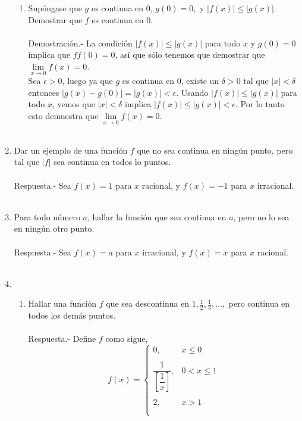 \begin{enumerate}[\bfseries 1.]
\begin{enumerate}[\bfseries (a)]
	\item Supóngase que $g$ es continua en $0$, $g(0)=0,$ y $|f(x)|\leq |g(x)|.$ Demostrar que $f$ es continua en $0$.\\\\
	    Demostración.-\; La condición $|f(x)|\leq |g(x)|$ para todo $x$ y $g(0)=0$ implica que $ff(0)=0$, así que sólo tenemos que demostrar que $\lim\limits_{x\to 0} f(x) = 0$.\\
	    Sea $\epsilon>0$, luego ya que $g$ es continua en $0$, existe un $\delta >0$ tal que $|x|<\delta$ entonces $|g(x)-g(0)|=|g(x)|<\epsilon$. Usando $|f(x)|\leq |g(x)|$ para todo $x$, vemos que $|x|<\delta$ implica $|f(x)|\leq |g(x)|<\epsilon$. Por lo tanto esto demuestra que $\lim\limits_{x\to 0} f(x) = 0$.\\\\

    \end{enumerate}

\item Dar un ejemplo de una función $f$ que no sea continua en ningún punto, pero tal que $|f|$ sea continua en todos lo puntos.\\\\
    Respuesta.-\; Sea $f(x)=1$ para $x$ racional, y $f(x)=-1$ para $x$ irracional.\\\\

\item Para todo número $a$, hallar la función que sea continua en $a$, pero no lo sea en ningún otro punto.\\\\
    Respuesta.-\; Sea $f(x)=a$ para $x$ irracional, y $f(x)=x$ para $x$ racional.\\\\

\item 
\begin{enumerate}[\bfseries (a)]

    \item Hallar una función $f$ que sea descontinua en $1,\frac{1}{2},\frac{1}{3},\ldots,$ pero continua en todos los demás puntos.\\\\
	Respuesta.-\; Define $f$ como sigue,
	$$f(x) = \left\{\begin{array}{rl}
	0,&x\leq 0\\\\
	\dfrac{1}{\left[\dfrac{1}{x}\right]},&0<x\leq 1\\\\
	  2,&x>1\\\\
	\end{array}\right.$$


\end{enumerate}
\end{enumerate}
